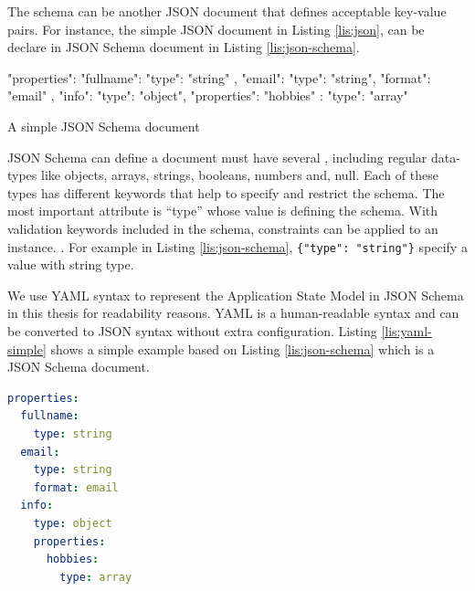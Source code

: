 The schema can be another JSON document that defines acceptable key-value pairs.
For instance, the simple JSON document in Listing \ref{lis:json}, can be declare in JSON Schema document in Listing \ref{lis:json-schema}.

\FloatBarrier
\begin{code}
\begin{json}
{
    "properties": {
        "fullname": {
            "type": "string"
        },
        "email": {
            "type": "string",
            "format": "email"
        },
        "info": {
            "type": "object",
            "properties": {
                "hobbies" : {
                    "type": "array"
                }
            }
        }        
    }
}
\end{json}
\caption{A simple JSON Schema document}
\label{lis:json-schema}
\end{code}
\FloatBarrier

JSON Schema can define a document must have several , including regular data-types like objects, arrays, strings, booleans, numbers and, null. Each of these types has different keywords that help to specify and restrict the schema. The most important attribute is “type” whose value is defining the schema. With validation keywords included in the schema, constraints can be applied to an instance. \cite{json-model}. For example in Listing \ref{lis:json-schema}, \lstinline[basicstyle=\ttfamily]|{"type": "string"}| specify a value with string type.

We use YAML syntax to represent the Application State Model in JSON Schema in this thesis for readability reasons. YAML is a human-readable syntax and can be converted to JSON syntax without extra configuration. Listing \ref{lis:yaml-simple} shows a simple example based on Listing \ref{lis:json-schema} which is a JSON Schema document.


\lstset{
  label=lis:yaml-simple, caption=Example of expressing JSON Schema in YAML syntax., 
}
\begin{lstlisting}[language=yaml]
properties:
  fullname:
    type: string
  email:
    type: string
    format: email
  info:
    type: object
    properties:
      hobbies:
        type: array
\end{lstlisting}

